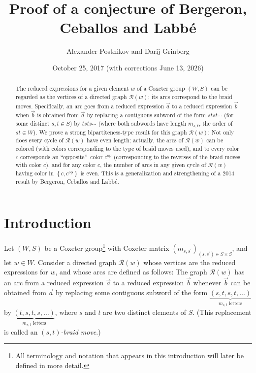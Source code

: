 \documentclass
[numbers=enddot,12pt,final,onecolumn,notitlepage,abstracton]{scrartcl}%
\theoremstyle{definition}
\begin{document}
\title{Proof of a conjecture of Bergeron, Ceballos and Labb\'e}
\author{Alexander Postnikov and Darij Grinberg}
\date{October 25, 2017 (with corrections June 13, 2026)}
\maketitle

\begin{abstract}
The reduced expressions for a given element $w$ of a Coxeter group $\left(
W,S\right)  $ can be regarded as the vertices of a directed graph
$\mathcal{R}\left(  w\right)  $; its arcs correspond to the braid moves.
Specifically, an arc goes from a reduced expression $\overrightarrow{a}$ to a
reduced expression $\overrightarrow{b}$ when $\overrightarrow{b}$ is obtained
from $\overrightarrow{a}$ by replacing a contiguous subword of the form
$stst\cdots$ (for some distinct $s,t\in S$) by $tsts\cdots$ (where both
subwords have length $m_{s,t}$, the order of $st\in W$). We prove a strong
bipartiteness-type result for this graph $\mathcal{R}\left(  w\right)  $: Not
only does every cycle of $\mathcal{R}\left(  w\right)  $ have even length;
actually, the arcs of $\mathcal{R}\left(  w\right)  $ can be colored (with
colors corresponding to the type of braid moves used), and to every color $c$
corresponds an \textquotedblleft opposite\textquotedblright\ color
$c^{\operatorname*{op}}$ (corresponding to the reverses of the braid moves
with color $c$), and for any color $c$, the number of arcs in any given cycle
of $\mathcal{R}\left(  w\right)  $ having color in $\left\{
c,c^{\operatorname*{op}}\right\}  $ is even. This is a generalization and
strengthening of a 2014 result by Bergeron, Ceballos and Labb\'{e}.

\end{abstract}

\section*{Introduction}

Let $\left(  W,S\right)  $ be a Coxeter group\footnote{All terminology and
notation that appears in this introduction will later be defined in more
detail.} with Coxeter matrix $\left(  m_{s,s^{\prime}}\right)  _{\left(
s,s^{\prime}\right)  \in S\times S}$, and let $w\in W$. Consider a directed
graph $\mathcal{R}\left(  w\right)  $ whose vertices are the reduced
expressions for $w$, and whose arcs are defined as follows: The graph
$\mathcal{R}\left(  w\right)  $ has an arc from a reduced expression
$\overrightarrow{a}$ to a reduced expression $\overrightarrow{b}$ whenever
$\overrightarrow{b}$ can be obtained from $\overrightarrow{a}$ by replacing
some contiguous subword of the form $\underbrace{\left(  s,t,s,t,\ldots
\right)  }_{m_{s,t}\text{ letters}}$ by $\underbrace{\left(  t,s,t,s,\ldots
\right)  }_{m_{s,t}\text{ letters}}$, where $s$ and $t$ are two distinct
elements of $S$. (This replacement is called an $\left(  s,t\right)
$\emph{-braid move}.)
\end{document}
